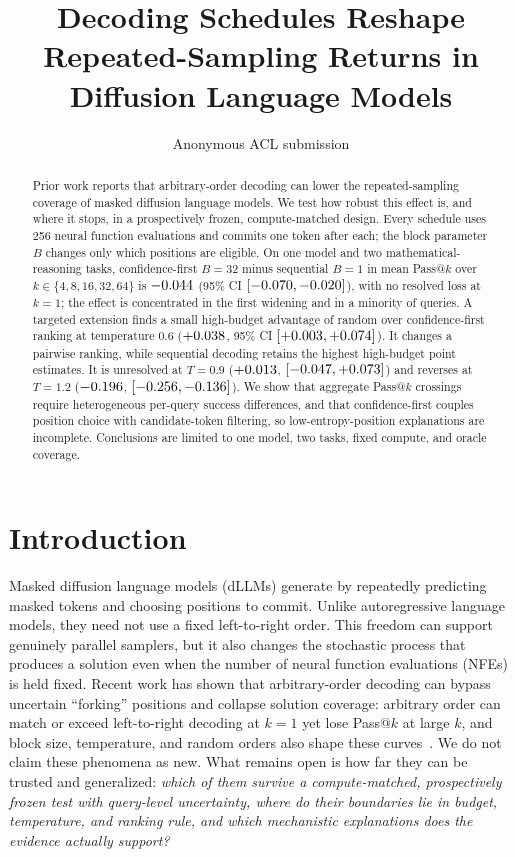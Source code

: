 \documentclass[11pt]{article}
\title{Decoding Schedules Reshape Repeated-Sampling Returns in Diffusion Language Models}
\author{Anonymous ACL submission}
\begin{document}
\maketitle

\begin{abstract}
Prior work reports that arbitrary-order decoding can lower the repeated-sampling coverage of masked diffusion language models. We test how robust this effect is, and where it stops, in a prospectively frozen, compute-matched design. Every schedule uses 256 neural function evaluations and commits one token after each; the block parameter $B$ changes only which positions are eligible. On one model and two mathematical-reasoning tasks, confidence-first $B=32$ minus sequential $B=1$ in mean Pass@$k$ over $k\in\{4,8,16,32,64\}$ is $-0.044$ (95\% CI $[-0.070,-0.020]$), with no resolved loss at $k=1$; the effect is concentrated in the first widening and in a minority of queries. A targeted extension finds a small high-budget advantage of random over confidence-first ranking at temperature $0.6$ ($+0.038$, 95\% CI $[+0.003,+0.074]$). It changes a pairwise ranking, while sequential decoding retains the highest high-budget point estimates. It is unresolved at $T=0.9$ ($+0.013$, $[-0.047,+0.073]$) and reverses at $T=1.2$ ($-0.196$, $[-0.256,-0.136]$). We show that aggregate Pass@$k$ crossings require heterogeneous per-query success differences, and that confidence-first couples position choice with candidate-token filtering, so low-entropy-position explanations are incomplete. Conclusions are limited to one model, two tasks, fixed compute, and oracle coverage.
\end{abstract}

\section{Introduction}

Masked diffusion language models (dLLMs) generate by repeatedly predicting masked tokens and choosing positions to commit. Unlike autoregressive language models, they need not use a fixed left-to-right order. This freedom can support genuinely parallel samplers, but it also changes the stochastic process that produces a solution even when the number of neural function evaluations (NFEs) is held fixed. Recent work has shown that arbitrary-order decoding can bypass uncertain ``forking'' positions and collapse solution coverage: arbitrary order can match or exceed left-to-right decoding at $k=1$ yet lose Pass@$k$ at large $k$, and block size, temperature, and random orders also shape these curves~\citep{ni2026flexibility}. We do not claim these phenomena as new. What remains open is how far they can be trusted and generalized: \emph{which of them survive a compute-matched, prospectively frozen test with query-level uncertainty, where do their boundaries lie in budget, temperature, and ranking rule, and which mechanistic explanations does the evidence actually support?}
\end{document}
